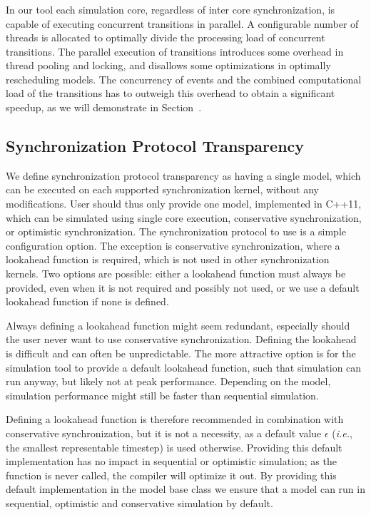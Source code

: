 \subsubsection{\pSim}
In our tool each simulation core, regardless of inter core synchronization, is capable of executing concurrent transitions in parallel. A configurable number of threads is allocated to optimally divide the processing load of concurrent transitions. The parallel execution of transitions introduces some overhead in thread pooling and locking, and disallows some optimizations in optimally rescheduling models. The concurrency of events and the combined computational load of the transitions has to outweigh this overhead to obtain a significant speedup, as we will demonstrate in Section~\textsc{}.

\subsection{Synchronization Protocol Transparency}
We define synchronization protocol transparency as having a single model, which can be executed on each supported synchronization kernel, without any modifications.
User should thus only provide one model, implemented in C++11, which can be simulated using single core execution, conservative synchronization, or optimistic synchronization.
The synchronization protocol to use is a simple configuration option.
The exception is conservative synchronization, where a lookahead function is required, which is not used in other synchronization kernels.
Two options are possible: either a lookahead function must always be provided, even when it is not required and possibly not used, or we use a default lookahead function if none is defined.

Always defining a lookahead function might seem redundant, especially should the user never want to use conservative synchronization.
Defining the lookahead is difficult and can often be unpredictable.
The more attractive option is for the simulation tool to provide a default lookahead function, such that simulation can run anyway, but likely not at peak performance.
Depending on the model, simulation performance might still be faster than sequential simulation. 

Defining a lookahead function is therefore recommended in combination with conservative synchronization, but it is not a necessity, as a default value $\epsilon$ (\textit{i.e.}, the smallest representable timestep) is used otherwise.
Providing this default implementation has no impact in sequential or optimistic simulation; as the function is never called, the compiler will optimize it out.
By providing this default implementation in the model base class we ensure that a model can run in sequential, optimistic and conservative simulation by default.

